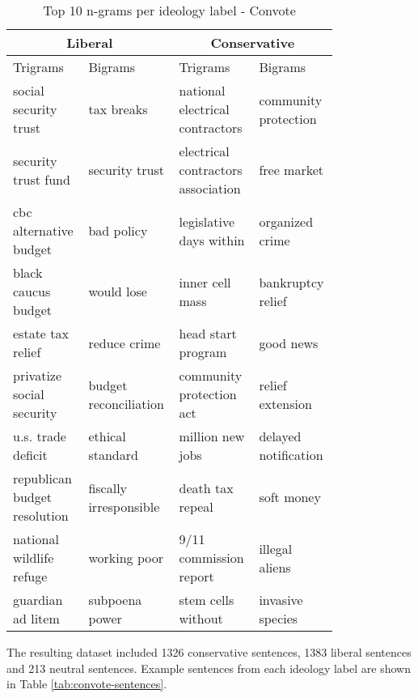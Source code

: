 \documentclass[10pt,a4paper,onecolumn]{article}
\begin{document}
\begin{table}[h!]
	\begin{center}
		\caption{Top 10 n-grams per ideology label - Convote}
		\label{tab:ngrams-convote}
		\begin{tabular}{p{0.2\linewidth}|p{0.2\linewidth}|p{0.2\linewidth}|p{0.2\linewidth}}
			\hline\hline
			\multicolumn{2}{c|}{\textbf{Liberal}} & \multicolumn{2}{c|}{\textbf{Conservative}} \\
			\hline
			Trigrams & Bigrams & Trigrams & Bigrams \\
			\hline
			social security trust & tax breaks & national electrical contractors & community protection \\
			security trust fund & security trust & electrical contractors association & free market \\
			cbc alternative budget & bad policy & legislative days within & organized crime \\
			black caucus budget & would lose & inner cell mass & bankruptcy relief \\
			estate tax relief & reduce crime & head start program & good news \\
			privatize social security & budget reconciliation & community protection act & relief extension \\
			u.s. trade deficit & ethical standard & million new jobs & delayed notification \\
			republican budget resolution & fiscally irresponsible & death tax repeal & soft money \\
			national wildlife refuge & working poor & 9/11 commission report & illegal aliens \\
			guardian ad litem & subpoena power & stem cells without & invasive species \\
			\hline\hline
		\end{tabular}
	\end{center}
\end{table}


The resulting dataset included 1326 conservative sentences, 1383 liberal sentences and 213 neutral sentences. Example sentences from each ideology label are shown in Table \ref{tab:convote-sentences}.
\end{document}
